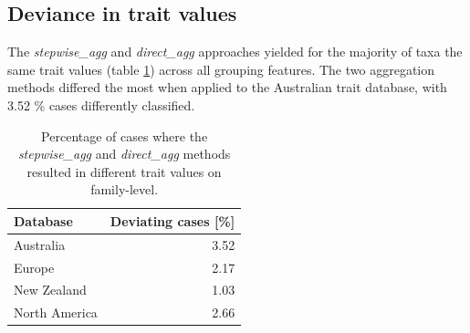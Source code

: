 \documentclass{article}
\begin{document}
\subsection{Deviance in trait values}


The \textit{stepwise\_agg} and \textit{direct\_agg} approaches yielded for the majority of taxa 
the same trait values (table \ref{tab:diff_trait_agg_methods}) across all grouping features.  
The two aggregation methods differed the most when applied to the Australian trait database, with 3.52 \% 
cases differently classified. 



\begin{table}[ht]
    \centering
    \caption{Percentage of cases where the \textit{stepwise\_agg} and \textit{direct\_agg} methods 
    resulted in different trait values on family-level.}
    \label{tab:diff_trait_agg_methods}
    \begin{tabular}{lr}
      \hline
    Database & Deviating cases [\%] \\ 
      \hline
    Australia & 3.52 \\ 
      Europe & 2.17 \\ 
      New Zealand & 1.03 \\ 
      North America & 2.66 \\ 
       \hline
    \end{tabular}
    \end{table}


% 


\end{document}
